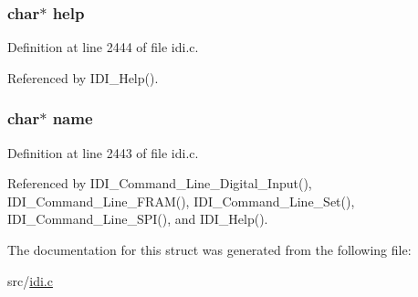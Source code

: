 \hypertarget{structcommand__line_a67b7e976c6444c3d7fab151527bdae33}{
\subsubsection[{help}]{\setlength{\rightskip}{0pt plus 5cm}char$\ast$ help}}\label{structcommand__line_a67b7e976c6444c3d7fab151527bdae33}


Definition at line 2444 of file idi.\+c.



Referenced by I\+D\+I\+\_\+\+Help().

\hypertarget{structcommand__line_a5ac083a645d964373f022d03df4849c8}{
\subsubsection[{name}]{\setlength{\rightskip}{0pt plus 5cm}char$\ast$ name}}\label{structcommand__line_a5ac083a645d964373f022d03df4849c8}


Definition at line 2443 of file idi.\+c.



Referenced by I\+D\+I\+\_\+\+Command\+\_\+\+Line\+\_\+\+Digital\+\_\+\+Input(), I\+D\+I\+\_\+\+Command\+\_\+\+Line\+\_\+\+F\+R\+A\+M(), I\+D\+I\+\_\+\+Command\+\_\+\+Line\+\_\+\+Set(), I\+D\+I\+\_\+\+Command\+\_\+\+Line\+\_\+\+S\+P\+I(), and I\+D\+I\+\_\+\+Help().



The documentation for this struct was generated from the following file\+:\begin{DoxyCompactItemize}
\item 
src/\hyperlink{idi_8c}{idi.\+c}\end{DoxyCompactItemize}
